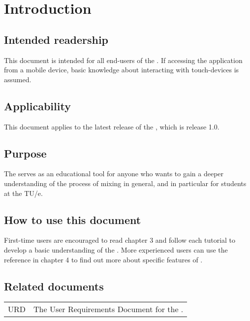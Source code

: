 \chapter{Introduction}

\section{Intended readership}
This document is intended for all end-users of the \applicationname{}. If accessing the application from a mobile device, basic knowledge about interacting with touch-devices is assumed.

\section{Applicability}
This document applies to the latest release of the \applicationname{}, which is release 1.0.

\section{Purpose}
The \applicationname{} serves as an educational tool for anyone who wants to gain a deeper understanding of the process of mixing in general, and in particular for students at the TU/e.

\section{How to use this document}
First-time users are encouraged to read chapter 3 and follow each tutorial to develop a basic understanding of the \applicationname{}. 
More experienced users can use the reference in chapter 4 to find out more about specific features of \projectname{}.

\section{Related documents}
\begin{tabular}{l l}
URD & The User Requirements Document for the \applicationname{}.\\
\end{tabular}

